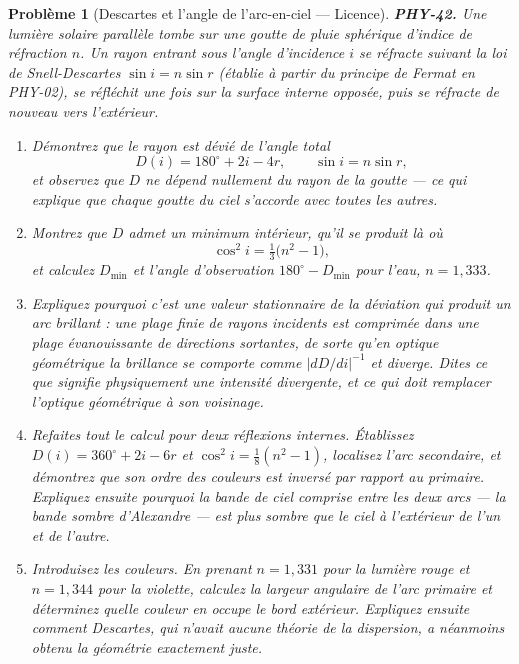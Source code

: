 \documentclass[11pt]{article}
\newtheorem{problem}{Problème}
\begin{document}
\begin{problem}[{Descartes et l'angle de l'arc-en-ciel --- Licence}]
\textbf{PHY-42.} Une lumière solaire parallèle tombe sur une goutte de pluie sphérique d'indice
de réfraction $ n $. Un rayon entrant sous l'angle d'incidence $ i $ se réfracte suivant la
loi de Snell-Descartes $ \sin i = n \sin r $ (établie à partir du principe de Fermat en
PHY-02), se réfléchit une fois sur la surface interne opposée, puis se réfracte de nouveau vers
l'extérieur.
\begin{enumerate}
\item[(a)] Démontrez que le rayon est dévié de l'angle total
\[ D(i) = 180^{\circ} + 2i - 4r, \qquad \sin i = n \sin r, \]
et observez que $ D $ ne dépend nullement du rayon de la goutte --- ce qui explique que chaque
goutte du ciel s'accorde avec toutes les autres.
\item[(b)] Montrez que $ D $ admet un minimum intérieur, qu'il se produit là où
\[ \cos^{2} i = \tfrac{1}{3}\bigl(n^{2}-1\bigr), \]
et calculez $ D_{\min} $ et l'angle d'observation $ 180^{\circ} - D_{\min} $ pour l'eau,
$ n = 1{,}333 $.
\item[(c)] Expliquez pourquoi c'est une valeur \textit{stationnaire} de la déviation qui produit un arc
brillant : une plage finie de rayons incidents est comprimée dans une plage évanouissante de
directions sortantes, de sorte qu'en optique géométrique la brillance se comporte comme
$ |dD/di|^{-1} $ et diverge. Dites ce que signifie physiquement une intensité divergente, et ce
qui doit remplacer l'optique géométrique à son voisinage.
\item[(d)] Refaites tout le calcul pour deux réflexions internes. Établissez
$ D(i) = 360^{\circ} + 2i - 6r $ et $ \cos^{2} i = \tfrac{1}{8}(n^{2}-1) $, localisez l'arc
secondaire, et démontrez que son ordre des couleurs est inversé par rapport au primaire.
Expliquez ensuite pourquoi la bande de ciel comprise entre les deux arcs --- la bande sombre
d'Alexandre --- est plus sombre que le ciel à l'extérieur de l'un et de l'autre.
\item[(e)] Introduisez les couleurs. En prenant $ n = 1{,}331 $ pour la lumière rouge et
$ n = 1{,}344 $ pour la violette, calculez la largeur angulaire de l'arc primaire et déterminez
quelle couleur en occupe le bord extérieur. Expliquez ensuite comment Descartes, qui n'avait
aucune théorie de la dispersion, a néanmoins obtenu la géométrie exactement juste.
\end{enumerate}

\end{problem}
\end{document}
